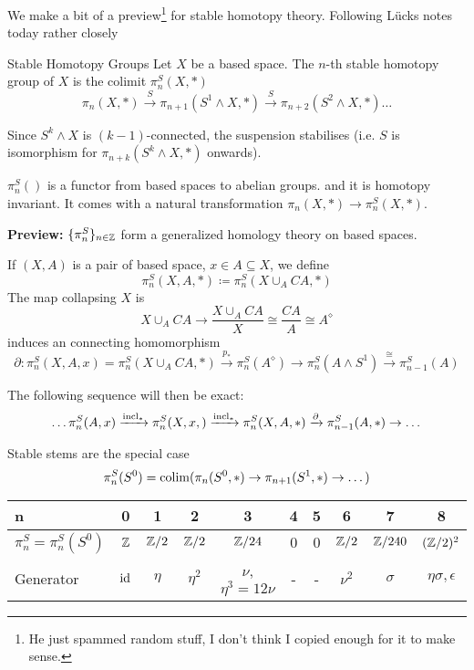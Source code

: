 \documentclass[language=english]{TemplateLecture}
\begin{document}

We make a bit of a preview\footnote{He just spammed random stuff, I don't think I copied enough for it to make sense.} for stable homotopy theory. Following Lücks notes today rather closely

\begin{defi}{}{Stable Homotopy Groups}
    Let \(X\) be a based space. The \(n\)-th stable homotopy group of \(X\) is the colimit \(\pi_n^S(X,*)\)
\[\pi_n(X,*)\xrightarrow{S} \pi_{n+1}(S^1 \wedge X, *) \xrightarrow{S} \pi_{n+2}(S^2 \wedge X, *)\dots\]
\end{defi}

Since \(S^k \wedge X\) is \((k-1)\)-connected, the suspension stabilises (i.e. \(S\) is isomorphism for \(\pi_{n+k}(S^k \wedge X, *)\) onwards).

\(\pi_n^S()\) is a functor from based spaces to abelian groups. and it is homotopy invariant. It comes with a natural transformation \(\pi_n(X,*) \to \pi_n^S(X,*)\).

\textbf{Preview:} \(\{\pi_n^S\}_{n \in \mathbb{Z}}\) form a generalized homology theory on based spaces.

If \((X,A)\) is a pair of based space, \(x \in A \subseteq X\), we define
\[\pi_n^S(X,A,*) \coloneq \pi_n^S(X\cup_A CA, *)\]
The map collapsing \(X\) is
\[X\cup_A CA \to \frac{X\cup_A CA}{X} \cong \frac{CA}{A} \cong A^\diamond\]
induces an connecting homomorphism
\[\partial\colon \pi_n^S(X,A,x) = \pi_n^S(X \cup_A CA, *) \xrightarrow{p_*} \pi_n^S(A^\diamond) \to \pi_n^S(A \wedge S^1) \xrightarrow{\cong} \pi_{n-1}^S(A)\]

The following sequence will then be exact:
\[\dots \pi_n^S(A,x)\xrightarrow{\operatorname{incl}_*} \pi_n^S(X,x,) \xrightarrow{\operatorname{incl}_*}\pi_n^S(X,A,*) \xrightarrow{\partial} \pi_{n-1}^S(A,*)\to \dots\]

Stable stems are the special case
\[\pi_n^S(S^0) = \operatorname*{\mathrm{colim}}(\pi_n(S^0, *) \to \pi_{n+1}(S^1, *)\to \dots)\]

\begin{center}
    \begin{tabular}{l|c|c|c|c|c|c|c|c|c}
        n & 0&1&2&3&4&5&6&7&8 \\\hline
        \(\pi_n^S = \pi_n^S(S^0)\) & \(\mathbb{Z}\) & \(\mathbb{Z}/2\) & \(\mathbb{Z}/2\) & \(\mathbb{Z}/24\) & \(0\)& \(0\) & \(\mathbb{Z}/2\) & \(\mathbb{Z}/240\) & \((\mathbb{Z}/2)^2\) \\\hline
        Generator & \(\operatorname{id}\) & \(\eta\) & \(\eta^2\) & \(\nu\), \(\eta^3 = 12 \nu\) & - & - & \(\nu^2\) & \(\sigma\) & \(\eta\sigma, \epsilon\)
    \end{tabular}
\end{center}
\end{document}
